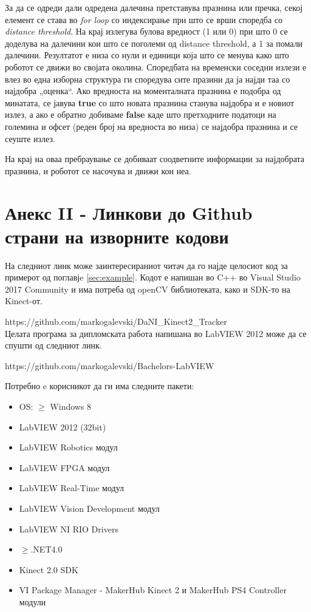 \documentclass[11pt]{article}
\begin{document}
  За да се одреди дали одредена далечина претставува празнина или пречка, секој елемент се става во \textit{for loop} со индексирање при што се врши споредба со \textit{distance threshold}. На крај излегува булова вредност (1 или 0) при што 0 се доделува на далечини кои што се поголеми од distance threshold, а 1 за помали далечини. Резултатот е низа со нули и единици која што се менува како што роботот се движи во својата околина. Споредбата на временски соседни излези е влез во една изборна структура ги споредува сите празини да ја најди таа со најдобра „оценка“. Ако вредноста на моменталната празнина е подобра од минатата, се јавува \textbf{true} со што новата празнина станува најдобра и е новиот излез, а ако е обратно добиваме \textbf{false} каде што претходните податоци на големина и офсет (реден број на вредноста во низа) се најдобра празнина и се сеуште излез.

  На крај на оваа пребраување се добиваат соодветните информации за најдобрата празнина, и роботот се насочува и движи кон неа.

\newpage

\section*{Анекс II - Линкови до Github страни на изворните кодови}
    На следниот линк може заинтересираниот читач да го најде целосиот код за примерот од поглавјe \ref{sec:example}. Кодот е напишан во C++ во Visual Studio 2017 Community и има потреба од openCV библиотеката, како и SDK-то на Kinect-от.

    https://github.com/markogalevski/DaNI\_Kinect2\_Tracker
    \\
    Целата програма за дипломската работа напишана во LabVIEW 2012 може да се спушти од следниот линк.

    https://github.com/markogalevski/Bachelors-LabVIEW

    Потребно e корисникот да ги има следните пакети:
    \begin{itemize}
      \item OS: $\geq$ Windows 8
      \item LabVIEW 2012 (32bit)
      \item LabVIEW Robotics модул
      \item LabVIEW FPGA модул
      \item LabVIEW Real-Time модул
      \item LabVIEW Vision Development модул
      \item LabVIEW NI RIO Drivers
      \item $\geq$.NET4.0
      \item Kinect 2.0 SDK
      \item VI Package Manager - MakerHub Kinect 2 и MakerHub PS4 Controller модули
      \end{itemize}

\medskip
\nocite{*}

\newpage

\printbibliography[heading=bibintoc,title={Користена литература}]
\end{document}
